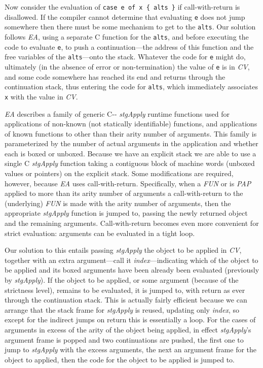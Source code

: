 \documentclass{llncs}
\begin{document}
Now consider the evaluation of \texttt{case e of x \{ alts \}} if
call-with-return is disallowed.  If the compiler cannot determine that
evaluating \texttt{e} does not jump somewhere then there must be some
mechanism to get to the \texttt{alts}.  Our solution follows \emph{EA}, using
a separate C function for the \texttt{alts}, and before executing the code to
evaluate \texttt{e}, to push a continuation---the address of this function and
the free variables of the \texttt{alts}---onto the stack.  Whatever the code
for \texttt{e} might do, ultimately (in the absence of error or
non-termination) the value of \texttt{e} is in \emph{CV}, and some code
somewhere has reached its end and returns through the continuation stack, thus
entering the code for \texttt{alts}, which immediately associates \texttt{x}
with the value in \emph{CV}.

\emph{EA} describes a family of generic C-{}- \emph{stgApply} runtime
functions used for applications of non-known (not statically identifiable)
functions, and applications of known functions to other than their arity
number of arguments.  This family is parameterized by the number of actual
arguments in the application and whether each is boxed or unboxed.  Because we
have an explicit stack we are able to use a single C \emph{stgApply} function
taking a contiguous block of machine words (unboxed values or pointers) on the
explicit stack.  Some modifications are required, however, because \emph{EA}
uses call-with-return.  Specifically, when a \emph{FUN} or is \emph{PAP}
applied to more than its arity number of arguments a call-with-return to the
(underlying) \emph{FUN} is made with the arity number of arguments, then the
appropriate \emph{stgApply} function is jumped to, passing the newly returned
object and the remaining arguments.  Call-with-return becomes even more
convenient for strict evaluation:  arguments can be evaluated in a tight
loop.

Our solution to this entails passing \emph{stgApply} the object to be applied
in \emph{CV}, together with an extra argument---call it
\emph{index}---indicating which of the object to be applied and its boxed
arguments have been already been evaluated (previously by \emph{stgApply}).
If the object to be applied, or some argument (because of the strictness
level), remains to be evaluated, it is jumped to, with return as ever through
the continuation stack.  This is actually fairly efficient because we can
arrange that the stack frame for \emph{stgApply} is reused, updating only
\emph{index}, so except for the indirect jumps on return this is essentially a
loop.  For the cases of arguments in excess of the arity of the object being
applied, in effect \emph{stgApply}'s argument frame is popped and two
continuations are pushed, the first one to jump to \emph{stgApply} with the
excess arguments, the next an argument frame for the object to applied, then
the code for the object to be applied is jumped to.
\end{document}
